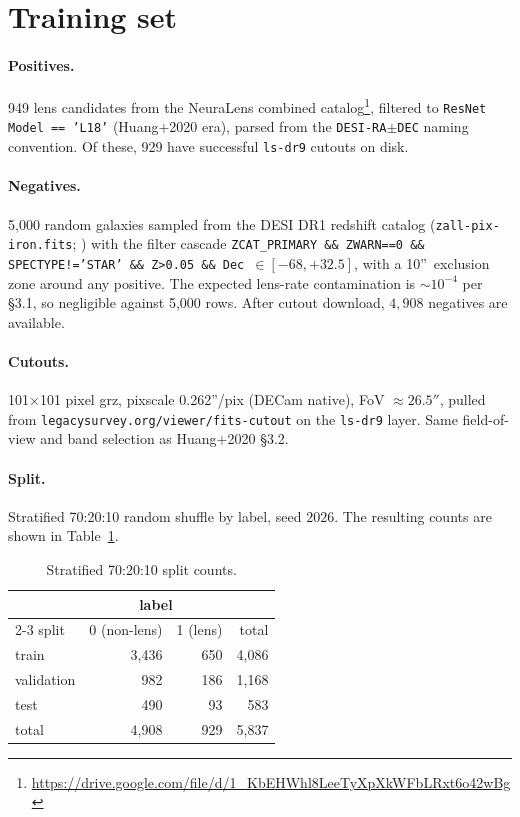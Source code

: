 \documentclass[11pt,letterpaper]{article}
\begin{document}
\section{Training set}

\paragraph{Positives.} 949 lens candidates from the NeuraLens combined
catalog\footnote{\url{https://drive.google.com/file/d/1_KbEHWhl8LeeTyXpXkWFbLRxt6o42wBg}},
filtered to \texttt{ResNet Model == 'L18'} (Huang+2020 era), parsed from
the \texttt{DESI-RA$\pm$DEC} naming convention. Of these, 929 have
successful \texttt{ls-dr9} cutouts on disk.

\paragraph{Negatives.} 5{,}000 random galaxies sampled from the
DESI DR1 redshift catalog
(\texttt{zall-pix-iron.fits}; \textcite{huang2025foundry1}) with the
filter cascade \texttt{ZCAT\_PRIMARY \&\& ZWARN==0 \&\& SPECTYPE!='STAR'
\&\& Z>0.05 \&\& Dec $\in [-68, +32.5]$}, with a 10''\ exclusion zone
around any positive. The expected lens-rate contamination is
$\sim 10^{-4}$ per \textcite{huang2020decals} \S3.1, so negligible
against 5{,}000 rows. After cutout download, $4{,}908$ negatives are
available.

\paragraph{Cutouts.} 101$\times$101 pixel grz, pixscale 0.262''/pix
(DECam native), FoV $\approx 26.5''$, pulled from
\texttt{legacysurvey.org/viewer/fits-cutout} on the \texttt{ls-dr9}
layer. Same field-of-view and band selection as Huang+2020 \S3.2.

\paragraph{Split.} Stratified 70:20:10 random shuffle by label, seed $2026$.
The resulting counts are shown in Table~\ref{tab:split}.

\begin{table}[ht]
\centering
\caption{Stratified 70:20:10 split counts.}
\label{tab:split}
\begin{tabular}{lrrr}
\toprule
            & \multicolumn{2}{c}{label} & \\
\cmidrule(lr){2-3}
split       & 0 (non-lens) & 1 (lens) & total \\
\midrule
train       & 3{,}436      & 650      & 4{,}086 \\
validation  &   982        & 186      & 1{,}168 \\
test        &   490        &  93      &   583   \\
\midrule
total       & 4{,}908      & 929      & 5{,}837 \\
\bottomrule
\end{tabular}
\end{table}
\end{document}

